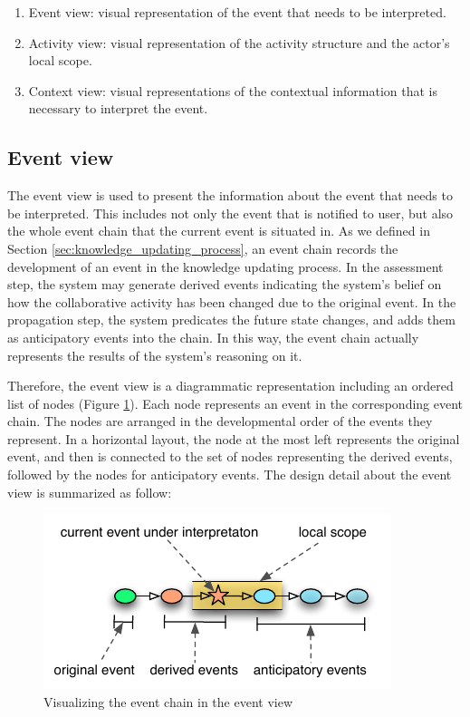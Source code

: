 \begin{enumerate}
	\item Event view: visual representation of the event that needs to be interpreted.
	\item Activity view: visual representation of the activity structure and the actor's local scope.
	\item Context view: visual representations of the contextual information that is necessary to interpret the event.
\end{enumerate}

\subsection{Event view} %
\label{sub:event_view}
The event view is used to present the information about the event that needs to be interpreted. This includes not only the event that is notified to user, but also the whole event chain that the current event is situated in. As we defined in Section \ref{sec:knowledge_updating_process}, an event chain records the development of an event in the knowledge updating process. In the assessment step, the system may generate derived events indicating the system's belief on how the collaborative activity has been changed due to the original event. In the propagation step, the system predicates the future state changes, and adds them as anticipatory events into the chain. In this way, the event chain actually represents the results of the system's reasoning on it. 

Therefore, the event view is a diagrammatic representation including an ordered list of nodes (Figure \ref{fig:event_chain}). Each node represents an event in the corresponding event chain. The nodes are arranged in the developmental order of the events they represent. In a horizontal layout, the node at the most left represents the original event, and then is connected to the set of nodes representing the derived events, followed by the nodes for anticipatory events. The design detail about the event view is summarized as follow:

\begin{figure}[htbp] %
	\centering
	\includegraphics{event_chain.pdf} 
	\caption{Visualizing the event chain in the event view}
	\label{fig:event_chain}
\end{figure}

